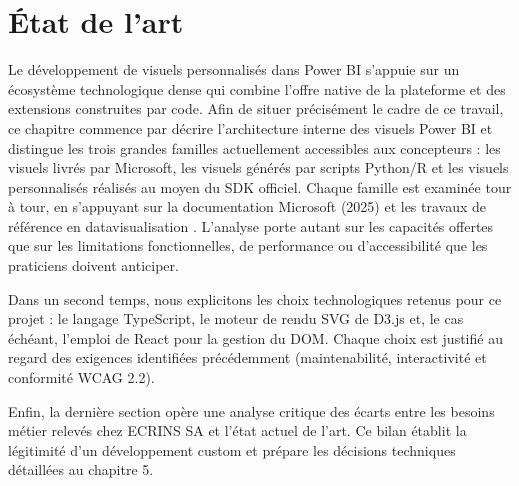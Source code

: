 \chapter{État de l'art}
\label{chap:state-of-the-art}
\setlength{\parindent}{0pt}



Le développement de visuels personnalisés dans Power BI s’appuie sur un écosystème technologique dense qui combine l’offre native de la plateforme et des extensions construites par code. 
Afin de situer précisément le cadre de ce travail, ce chapitre commence par décrire l'architecture interne des visuels Power BI et distingue les trois grandes familles actuellement accessibles aux concepteurs : les visuels livrés par Microsoft, les visuels générés par scripts Python/R et les visuels personnalisés réalisés au moyen du SDK officiel. 
Chaque famille est examinée tour à tour, en s’appuyant sur la documentation Microsoft (2025) et les travaux de référence en datavisualisation \parencite{Ware2019, MicrosoftPBISDKTS2025}. L’analyse porte autant sur les capacités offertes que sur les limitations fonctionnelles, de performance ou d’accessibilité que les praticiens doivent anticiper.

Dans un second temps, nous explicitons les choix technologiques retenus pour ce projet : le langage TypeScript, le moteur de rendu SVG de D3.js et, le cas échéant, l’emploi de React pour la gestion du DOM. Chaque choix est justifié au regard des exigences identifiées précédemment (maintenabilité, interactivité et conformité WCAG 2.2).

Enfin, la dernière section opère une analyse critique des écarts entre les besoins métier relevés chez ECRINS SA et l’état actuel de l’art. Ce bilan établit la légitimité d’un développement custom et prépare les décisions techniques détaillées au chapitre 5.











